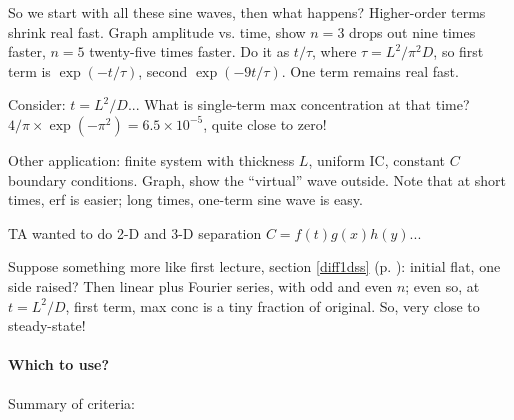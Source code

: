 \documentclass{report}
\begin{document}
\begin{itemize}
  So we start with all these sine waves, then what happens?  Higher-order terms
  shrink real fast.  Graph amplitude vs. time, show $n=3$ drops out nine times
  faster, $n=5$ twenty-five times faster.  Do it as $t/\tau$, where
  $\tau=L^2/\pi^2D$, so first term is $\exp(-t/\tau)$, second $\exp(-9t/\tau)$.
  One term remains real fast.

  Consider: $t=L^2/D$...  What is single-term max concentration at that time?
  $4/\pi \times \exp(-\pi^2) = 6.5\times10^{-5}$, quite close to zero!

  Other application: finite system with thickness $L$, uniform IC, constant $C$
  boundary conditions. Graph, show the ``virtual'' wave outside.  Note that at
  short times, erf is easier; long times, one-term sine wave is easy.

  TA wanted to do 2-D and 3-D separation $C=f(t)g(x)h(y)$...

  Suppose something more like first lecture, section \ref{diff1dss} (p.
  \pageref{diff1dss}): initial flat, one side raised?  Then linear plus Fourier
  series, with odd and even $n$; even so, at $t=L^2/D$, first term, max conc is
  a tiny fraction of original.  So, very close to steady-state!
\end{itemize}

\paragraph{Which to use?} Summary of criteria:
\end{document}
